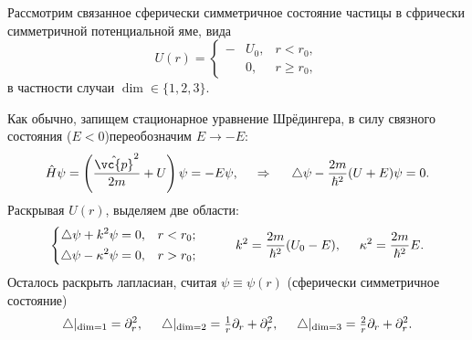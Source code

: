 
Рассмотрим связанное сферически симметричное состояние частицы в сфрически симметричной потенциальной яме, вида
\begin{equation*}
    U(r) = \left\{\begin{aligned}
        - &U_0, &r < r_0, \\
        &0, &r \geq r_0,
    \end{aligned}\right.
\end{equation*}
в частности случаи $\dim \in \{1, 2, 3\}$.

Как обычно, запищем стационарное уравнение Шрёдингера, в силу связного состояния ($E < 0$)переобозначим $E \to -E$:
\begin{equation*}
    \hat{H} \psi = \left(\frac{\hat{\vc{p}}^2}{2m} + U\right) \psi = - E \psi,
    \hspace{0.5cm} \Rightarrow \hspace{0.5cm}
     \triangle \psi - \frac{2m}{\hbar^2}(U+E) \psi = 0.
\end{equation*}
Раскрывая $U(r)$, выделяем две области:
\begin{equation*}
    \left\{\begin{aligned}
        \triangle \psi + k^2 \psi &= 0,  &r < r_0; \\
        \triangle \psi - \kappa^2 \psi &= 0, &r > r_0;
    \end{aligned}\right.
    \hspace{10 mm} 
    k^2 = \frac{2m}{\hbar^2} (U_0 - E),
    \hspace{5 mm} 
    \kappa^2 = \frac{2m}{\hbar^2} E.
\end{equation*}
Осталось раскрыть лапласиан, считая $\psi \equiv \psi(r)$ (сферически симметричное состояние)
\begin{equation*}
    \triangle|_{\dim=1} = \partial_r^2, \hspace{5 mm} 
    \triangle|_{\dim=2} = \tfrac{1}{r} \partial_r + \partial_r^2, \hspace{5 mm} 
    \triangle|_{\dim=3} = \tfrac{2}{r} \partial_r + \partial_r^2.
\end{equation*}

